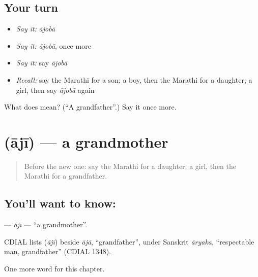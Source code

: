 \subsection*{Your turn}
\begin{itemize}
\raggedright
  \item \emph{Say it:} \emph{ājobā}
  \item \emph{Say it:} \emph{ājobā}, once more
  \item \emph{Say it:} say \emph{ājobā}
  \item \emph{Recall:} say the Marathi for a son; a boy, then the Marathi for a daughter; a girl, then say \emph{ājobā} again
\end{itemize}

\begin{tcolorbox}[breakable,colback=teal!4,colframe=teal!35!black,title={Before you move on}]
What does  mean? (\textquotedblleft{}A grandfather\textquotedblright{}.) Say it once more.
\end{tcolorbox}
\section[\texorpdfstring{\mr{आजी} (ājī)}{आजी (ājī)}]{ (ājī) — a grandmother}

\label{lesson:MR-C75-aji}



\begin{quote}
Before the new one: say the Marathi for a daughter; a girl, then the Marathi for a grandfather.
\end{quote}

\subsection*{You'll want to know: }
\textbf{} — \emph{ājī} — \textquotedblleft{}a grandmother\textquotedblright{}.

\begin{cousinweb}
CDIAL lists \textbf{} (\emph{ājī}) beside \emph{ājā}, \textquotedblleft{}grandfather\textquotedblright{}, under Sanskrit \emph{āryaka}, \textquotedblleft{}respectable man, grandfather\textquotedblright{} (CDIAL 1348).
\end{cousinweb}

\begin{grammarlens}[title={What you've built}]
One more word for this chapter.
\end{grammarlens}

